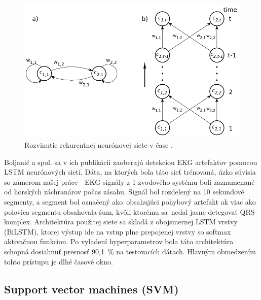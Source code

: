 \begin{figure}[H]
    \centering
    \includegraphics[scale=0.7]{img/backpropagation.png}
    \caption{Rozvinutie rekurentnej neurónovej siete v čase \cite{Yu2019}.}
    \label{fig:backpropagation}
\end{figure}

Boljanić a spol. \cite{boljanic2022} sa v ich publikácii zaoberajú detekciou EKG artefaktov pomocou LSTM neurónových sietí. Dáta, na ktorých bola táto sieť trénovaná, úzko súvisia so zámerom našej práce - EKG signály z 1-zvodového systému boli zaznamenané od horských záchranárov počas zásahu. Signál bol rozdelený na 10 sekundové segmenty, a segment bol označený ako~obsahujúci pohybový artefakt ak viac ako polovica segmentu obsahovala šum, kvôli ktorému sa~nedal jasne detegovať QRS-komplex. Architektúra použitej siete sa skladá z obojsmernej LSTM vrstvy (BiLSTM), ktorej výstup ide na vstup plne prepojenej vrstvy so softmax aktivačnou funkciou. Po vyladení hyperparametrov bola táto architektúra schopná dosiahnuť presnosť 90,1~\% na testovacích dátach. Hlavným obmedzením tohto prístupu je dlhé časové okno.

\subsection{Support vector machines (SVM)}

